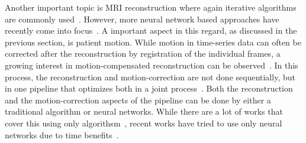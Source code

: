 Another important topic is MRI reconstruction where again iterative algorithms are commonly used~\cite{AdvancesPI,CS-MRI,ParallelMRI,GRAPPA}. However, more neural network based approaches have recently come into focus~\cite{DeepMRIReconstructionSubsampling, DeepMRIReconstructionRadialSubsampling}. A important aspect in this regard, as discussed in the previous section, is patient motion. While motion in time-series data can often be corrected after the reconstruction by registration of the individual frames, a growing interest in motion-compensated reconstruction can be observed~\cite{Oksuz2020}. In this process, the reconstruction and motion-correction are not done sequentially, but in one pipeline that optimizes both in a joint process~\cite{Kuestner2022}. Both the reconstruction and the motion-correction aspects of the pipeline can be done by either a traditional algorithm or neural networks. While there are a lot of works that cover this using only algorithsm~\cite{GRICS}, recent works have tried to use only neural networks due to time benefits~\cite{Pan2024,Zou2024}.



